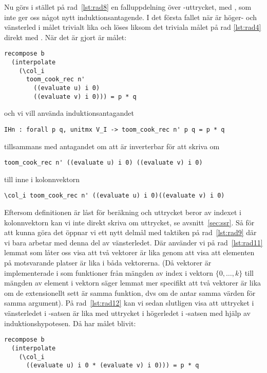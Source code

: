 Nu görs i stället på rad~\ref{lst:rad8} en falluppdelning över
-uttrycket, med , som inte ger oss något nytt
induktionsantagende. I det första fallet när 
är höger- och vänsterled i målet trivialt lika och löses liksom det triviala
målet på rad \ref{lst:rad4} direkt med \C{//}. När det är gjort är målet:
\begin{lstlisting}
recompose b
  (interpolate
    (\col_i
      toom_cook_rec n'
        ((evaluate u) i 0)
        ((evaluate v) i 0))) = p * q
\end{lstlisting}
och vi vill använda induktionsantagandet
\begin{lstlisting}
IHn : forall p q, unitmx V_I -> toom_cook_rec n' p q = p * q
\end{lstlisting}
tillsammans med antagandet  om att  är inverterbar för att
skriva om
\begin{lstlisting}
toom_cook_rec n' ((evaluate u) i 0) ((evaluate v) i 0)
\end{lstlisting}
till  inne i kolonnvektorn
\begin{lstlisting}
\col_i toom_cook_rec n' ((evaluate u) i 0)((evaluate v) i 0)
\end{lstlisting}
Eftersom definitionen  är låst för beräkning och uttrycket beror av
indexet  i kolonnvektorn kan vi inte direkt skriva om uttrycket, se
avsnitt~\ref{sec:ssr}. Så för att kunna göra det öppnar vi ett nytt delmål
med taktiken  på rad~\ref{lst:rad9} där vi bara arbetar med denna del av
vänsterledet. Där använder vi på rad~\ref{lst:rad11} lemmat  som låter oss visa
att två vektorer är lika genom att visa att elementen på motsvarande platser är
lika i båda vektorerna. (Då vektorer är implementerade i \ssr{} som funktioner
från mängden av index i vektorn $\{0, \ldots , k\}$ till mängden av element i
vektorn säger lemmat mer specifikt att två vektorer är lika om de extensionellt
sett är samma funktion, dvs om de antar samma värden för samma argument). På
rad~\ref{lst:rad12} kan vi sedan slutligen visa att uttrycket i vänsterledet i
-satsen är lika med uttrycket i högerledet i -satsen med hjälp
av induktionshypotesen. Då har målet blivit:
\begin{lstlisting}
recompose b
  (interpolate
    (\col_i
      ((evaluate u) i 0 * (evaluate v) i 0))) = p * q
\end{lstlisting}

